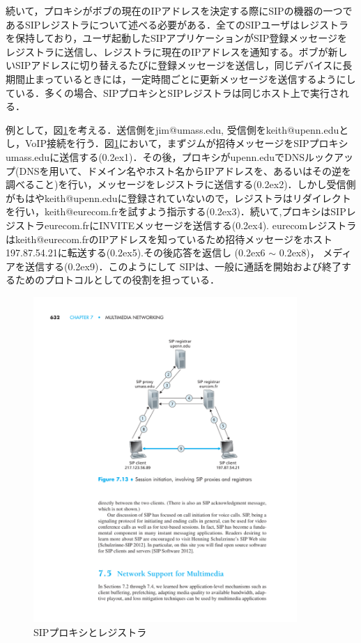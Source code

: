 続いて，プロキシがボブの現在のIPアドレスを決定する際にSIPの機器の一つであるSIPレジストラについて述べる必要がある．全てのSIPユーザはレジストラを保持しており，ユーザ起動したSIPアプリケーションがSIP登録メッセージをレジストラに送信し、レジストラに現在のIPアドレスを通知する。ボブが新しいSIPアドレスに切り替えるたびに登録メッセージを送信し，同じデバイスに長期間止まっているときには，一定時間ごとに更新メッセージを送信するようにしている．多くの場合、SIPプロキシとSIPレジストラは同じホスト上で実行される．

例として，図\ref{fig:sip_registrar_and_proxy}を考える．送信側をjim@umass.edu, 受信側をkeith@upenn.eduとし，VoIP接続を行う．図\ref{fig:sip_registrar_and_proxy}において，まずジムが招待メッセージをSIPプロキシumass.eduに送信する(\raise0.2ex\hbox{\textcircled{\scriptsize{1}}})．その後，プロキシがupenn.eduでDNSルックアップ(DNSを用いて、ドメイン名やホスト名からIPアドレスを、あるいはその逆を調べること)を行い，メッセージをレジストラに送信する(\raise0.2ex\hbox{\textcircled{\scriptsize{2}}})．しかし受信側がもはやkeith@upenn.eduに登録されていないので，レジストラはリダイレクトを行い，keith@eurecom.frを試すよう指示する(\raise0.2ex\hbox{\textcircled{\scriptsize{3}}})．続いて,プロキシはSIPレジストラeurecom.frにINVITEメッセージを送信する(\raise0.2ex\hbox{\textcircled{\scriptsize{4}}}). eurecomレジストラはkeith@eurecom.frのIPアドレスを知っているため招待メッセージをホスト197.87.54.21に転送する(\raise0.2ex\hbox{\textcircled{\scriptsize{5}}}).その後応答を返信し
(\raise0.2ex\hbox{\textcircled{\scriptsize{6}}} $\sim$ \raise0.2ex\hbox{\textcircled{\scriptsize{8}}})，
メディアを送信する(\raise0.2ex\hbox{\textcircled{\scriptsize{9}}})．このようにして SIPは、一般に通話を開始および終了するためのプロトコルとしての役割を担っている．

\begin{figure}[tb]
\includegraphics[width=10cm,pagebox=cropbox,clip]{sip_registrar_and_proxy.pdf}
 \caption{SIPプロキシとレジストラ}
 \label{fig:sip_registrar_and_proxy}
\end{figure}

